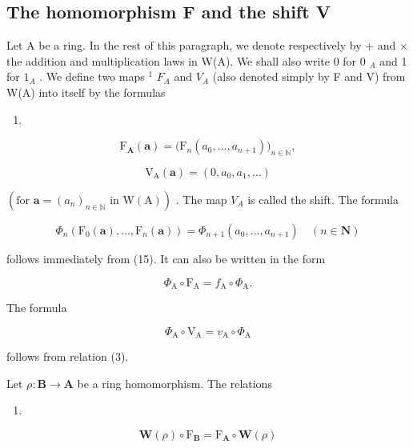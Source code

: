 \subsection{The homomorphism F and the shift V}

Let A be a ring. In the rest of this paragraph, we denote respectively by + and × the addition and multiplication laws in W(A). We shall also write 0 for 0 \(_{A}\) and 1 for \(1_{A}\) . We define two maps \(^{1}\) \(F_{A}\) and \(V_{A}\) (also denoted simply by F and V) from W(A) into itself by the formulas

\begin{enumerate}
\def\labelenumi{(\arabic{enumi})}
\setcounter{enumi}{22}
\tightlist
\item
\end{enumerate}

\[
\mathrm{F} _ {\mathbf {A}} (\boldsymbol {a}) = \big (\mathrm{F} _ {n} (a _ {0},..., a _ {n + 1}) \big) _ {n \in \mathbb {N}},\tag{24}
\]

\[
\mathrm{V} _ {\mathrm{A}} (\boldsymbol {a}) = (0, a _ {0}, a _ {1}, \dots)
\]

\((\text{for } \boldsymbol{a} = (a_n)_{n \in \mathbb{N}} \text{ in } \mathrm{W(A)})\) . The map \(V_A\) is called the shift. The formula

\[
\Phi_ {n} \left(\mathrm{F} _ {0} (\boldsymbol {a}), \dots , \mathrm{F} _ {n} (\boldsymbol {a})\right) = \Phi_ {n + 1} \left(a _ {0}, \dots , a _ {n + 1}\right) \quad (n \in \mathbf {N})\tag{25}
\]

follows immediately from (15). It can also be written in the form

\[
\Phi_ {\mathrm{A}} \circ \mathrm{F} _ {\mathrm{A}} = f _ {\mathrm{A}} \circ \Phi_ {\mathrm{A}}.\tag{26}
\]

The formula

\[
\Phi_ {\mathrm{A}} \circ \mathrm{V} _ {\mathrm{A}} = v _ {\mathrm{A}} \circ \Phi_ {\mathrm{A}}\tag{27}
\]

follows from relation (3).

Let \(\rho : \mathbf{B} \to \mathbf{A}\) be a ring homomorphism. The relations

\begin{enumerate}
\def\labelenumi{(\arabic{enumi})}
\setcounter{enumi}{27}
\tightlist
\item
\end{enumerate}

\[
\mathbf {W} (\rho) \circ \mathrm{F} _ {\mathbf {B}} = \mathrm{F} _ {\mathbf {A}} \circ \mathbf {W} (\rho)\tag{29}
\]

